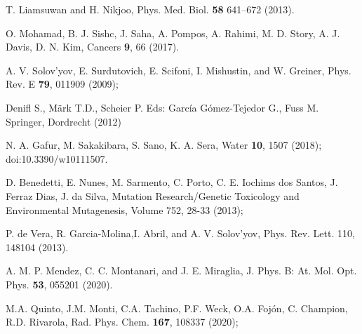 \documentclass[10pt,showpacs,showkeys,twocolumn]{revtex4}
\begin{document}
\bigskip

\begin{thebibliography}{}

 T. Liamsuwan and H. Nikjoo, Phys. Med. Biol. \textbf{58}  641--672 (2013).

O. Mohamad, B. J. Sishc, J. Saha, A. Pompos, A. Rahimi, M. D. Story, A. J. Davis, D. N. Kim, Cancers \textbf{9}, 66 (2017).

 A. V. Solov'yov, E. Surdutovich, E. Scifoni, I. Mishustin, and W. Greiner, Phys. Rev. E \textbf{79}, 011909 (2009);

Denifl S., Märk T.D., Scheier P. 
Eds: Garc\'ia G\'omez-Tejedor G., Fuss M. 
Springer, Dordrecht (2012) 

 N. A. Gafur, M.  Sakakibara, S. Sano, K. A. Sera, 
Water \textbf{10}, 1507 (2018); doi:10.3390/w10111507.

 D. Benedetti, E. Nunes, M. Sarmento, C. Porto, C. E. Iochims dos Santos, J. Ferraz Dias, J. da Silva,
Mutation Research/Genetic Toxicology and Environmental Mutagenesis,
Volume 752, 28-33 (2013);

 P. de Vera, R. Garcia-Molina,I. Abril, and A. V. Solov’yov, Phys. Rev. Lett.  110, 148104 (2013).

A. M. P. Mendez, C. C. Montanari, and J. E. Miraglia, J. Phys. B: At. Mol. Opt. Phys.  \textbf{53}, 055201 (2020).

 M.A. Quinto, J.M. Monti, C.A. Tachino, P.F. Weck, O.A. Foj\'on, C. Champion, R.D. Rivarola, 
Rad. Phys. Chem. \textbf{167}, 108337 (2020);


\end{thebibliography}
\end{document}
